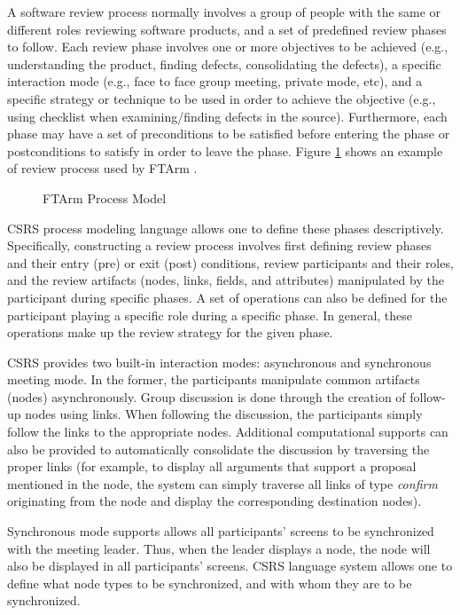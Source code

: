 A software review process normally involves a group of
people with the same or different roles reviewing software
products, and a set of predefined review phases to follow. Each review
phase involves one or more objectives to be achieved (e.g.,
understanding the product, finding defects, consolidating the
defects), a specific interaction mode (e.g., face to face group
meeting, private mode, etc), and a specific strategy or technique to
be used in order to achieve the objective (e.g., using checklist
when examining/finding defects in the source). Furthermore, each phase
may have a set of preconditions to be satisfied before entering the
phase or postconditions to satisfy in order to leave the phase.
Figure \ref{fig:async-process-model} shows an example of review
process used by FTArm \cite{Johnson93,CSDL-93-17}. 

\begin{figure}[htb]
  {\centerline{}}
  \caption{FTArm Process Model}
  \label{fig:async-process-model}
\end{figure}

CSRS process modeling language allows one to define these phases
descriptively. 
Specifically, constructing a review process involves first defining
review phases and their entry (pre) or exit (post) conditions, review
participants and their roles, and the
review artifacts (nodes, links, fields, and attributes) manipulated by
the participant during specific phases.  
A set of operations can also be defined for the participant 
playing a specific role during a specific phase. In general, these
operations make up the review strategy for the given phase.

CSRS provides two built-in interaction modes: asynchronous
and synchronous meeting mode. In the former, the
participants manipulate common artifacts (nodes) asynchronously.
Group discussion is done through the creation of follow-up nodes using
links. When following the discussion, the participants simply follow the
links to the appropriate nodes. Additional computational supports can
also be provided to automatically consolidate the discussion by 
traversing the proper links (for example, to display all arguments that
support a proposal mentioned in the node, the system can simply traverse
all links of type {\it confirm} originating from the node and display
the corresponding destination nodes).

Synchronous mode supports allows all participants' screens to be
synchronized with the meeting leader. Thus, when the leader displays a
node, the node will also be displayed in all participants' screens.
CSRS language system allows one to define what node types to be
synchronized, and with whom they are to be synchronized. 

